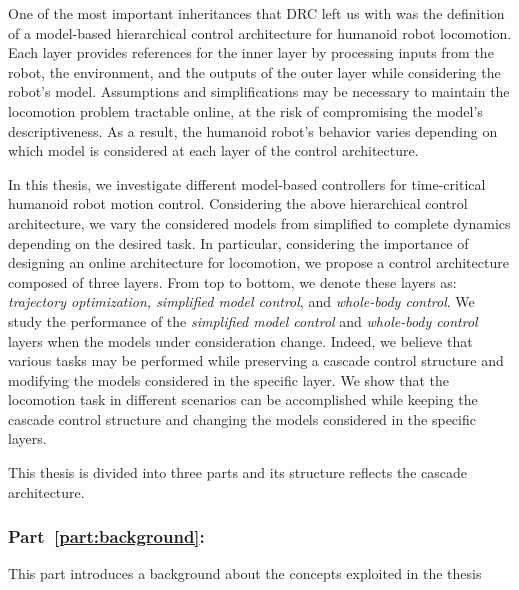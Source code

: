 \par
One of the most important inheritances that DRC left us with was the definition of a model-based hierarchical control architecture for humanoid robot locomotion. Each layer provides references for the inner layer by processing inputs from the robot, the environment, and the outputs of the outer layer while considering the robot's model.
Assumptions and simplifications may be necessary to maintain the locomotion problem tractable online, at the risk of compromising the model's descriptiveness. As a result, the humanoid robot's behavior varies depending on which model is considered at each layer of the control architecture.
\par
In this thesis, we investigate different model-based controllers for time-critical humanoid robot motion control. Considering the above hierarchical control architecture, we vary the considered models from simplified to complete dynamics depending on the desired task. In particular, considering the importance of designing an online architecture for locomotion, we propose a control architecture composed of three layers. From top to bottom, we denote these layers as: \emph{trajectory optimization, simplified model control}, and \emph{whole-body control}. We study the performance of the \emph{simplified model control} and \emph{whole-body control} layers when the models under consideration change.
Indeed, we believe that various tasks may be performed while preserving a cascade control structure and modifying the models considered in the specific layer.
We show that the locomotion task in different scenarios can be accomplished while keeping the cascade control structure and changing the models considered in the specific layers.
\par
This thesis is divided into three parts and its structure reflects the cascade architecture.  


\subsubsection*{Part~\ref{part:background}: }
This part introduces a background about the concepts exploited in the thesis

